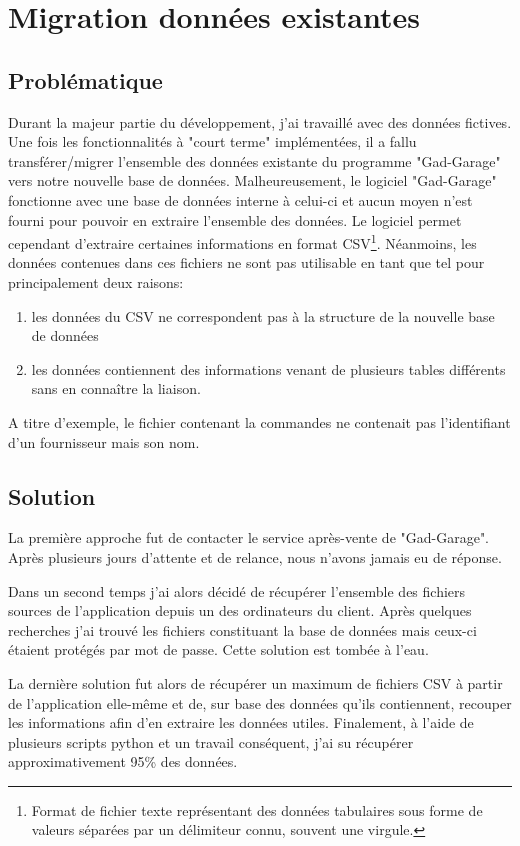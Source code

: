 \section{Migration données existantes}
\subsection{Problématique}

Durant la majeur partie du développement, j'ai travaillé avec des données fictives. Une fois les fonctionnalités à "court terme" implémentées, il a fallu transférer/migrer l'ensemble des données existante du programme "Gad-Garage" vers notre nouvelle base de données. Malheureusement, le logiciel "Gad-Garage" fonctionne avec une base de données interne à celui-ci et aucun moyen n'est fourni pour pouvoir en extraire l'ensemble des données. Le logiciel permet cependant d'extraire certaines informations en format CSV\footnote{Format de fichier texte représentant des données tabulaires sous forme de valeurs séparées par un délimiteur connu, souvent une virgule.}. Néanmoins, les données contenues dans ces fichiers ne sont pas utilisable en tant que tel pour principalement deux raisons: 
\begin{enumerate}
  \item les données du CSV ne correspondent pas à la structure de la nouvelle base de données
  \item les données contiennent des informations venant de plusieurs tables différents sans en connaître la liaison.
\end{enumerate}
A titre d'exemple, le fichier contenant la commandes ne contenait pas l'identifiant d'un fournisseur mais son nom.

\subsection{Solution}

La première approche fut de contacter le service après-vente de "Gad-Garage". Après plusieurs jours d'attente et de relance, nous n'avons jamais eu de réponse. 

\newpara

Dans un second temps j'ai alors décidé de récupérer l'ensemble des fichiers sources de l'application depuis un des ordinateurs du client. Après quelques recherches j'ai trouvé les fichiers constituant la base de données mais ceux-ci étaient protégés par mot de passe. Cette solution est tombée à l'eau.

\newpara

La dernière solution fut alors de récupérer un maximum de fichiers CSV à partir de l'application elle-même et de, sur base des données qu'ils contiennent, recouper les informations afin d'en extraire les données utiles. Finalement, à l'aide de plusieurs scripts python et un travail conséquent, j'ai su récupérer approximativement 95\% des données.